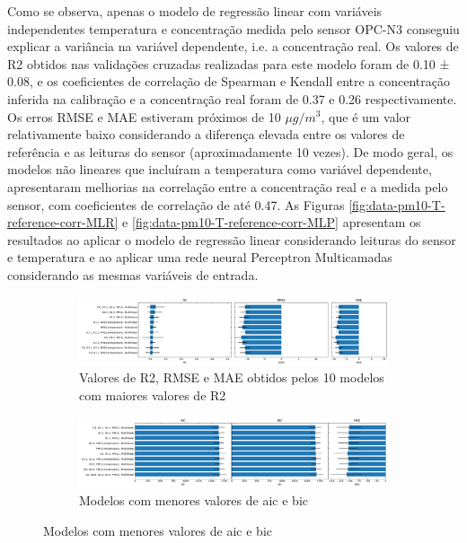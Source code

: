 Como se observa, apenas o modelo de regressão linear com variáveis independentes temperatura e concentração medida pelo sensor OPC-N3 conseguiu explicar a variância na variável dependente, i.e. a concentração real. Os valores de R2 obtidos nas validações cruzadas realizadas para este modelo foram de 0.10 ± 0.08, e os coeficientes de correlação de Spearman e Kendall entre a concentração inferida na calibração e a concentração real foram de 0.37 e 0.26 respectivamente. Os erros RMSE e MAE estiveram próximos de 10 \(\mu g/m^3\), que é um valor relativamente baixo considerando a diferença elevada entre os valores de referência e as leituras do sensor (aproximadamente 10 vezes). De modo geral, os modelos não lineares que incluíram a temperatura como variável dependente, apresentaram melhorias na correlação entre a concentração real e a medida pelo sensor, com coeficientes de correlação de até 0.47. As Figuras \ref{fig:data-pm10-T-reference-corr-MLR} e \ref{fig:data-pm10-T-reference-corr-MLP} apresentam os resultados ao aplicar o modelo de regressão linear considerando leituras do sensor e temperatura e ao aplicar uma rede neural Perceptron Multicamadas considerando as mesmas variáveis de entrada.

\begin{figure}[h!]
    \centering
    \caption{Desempenho dos modelos de regressão aplicados para inferir as leituras de concentração de \acrshort{mp10} medidas pela estação de referência}
    \begin{subfigure}{0.9\textwidth}
        \includegraphics[width=\textwidth]{chapters/4-CALIBRAÇÃO MÚLTIPLOS SENSORES/Figuras/pm10-all-models-performance.png}
        \caption{Valores de R2, RMSE e MAE obtidos pelos 10 modelos com maiores valores de R2}
        \label{fig:data-pm10-all-models-performance}
    \end{subfigure}
    \begin{subfigure}{0.9\textwidth}
        \includegraphics[width=\textwidth]{chapters/4-CALIBRAÇÃO MÚLTIPLOS SENSORES/Figuras/pm10-all-models-complexity.png}
        \caption{Modelos com menores valores de \acrshort{aic} e \acrshort{bic}}
        \label{fig:data-pm10-all-models-comlexity}
    \end{subfigure}
    \label{fig:data-pm10-all-models-performance-comlexity}
\end{figure}

